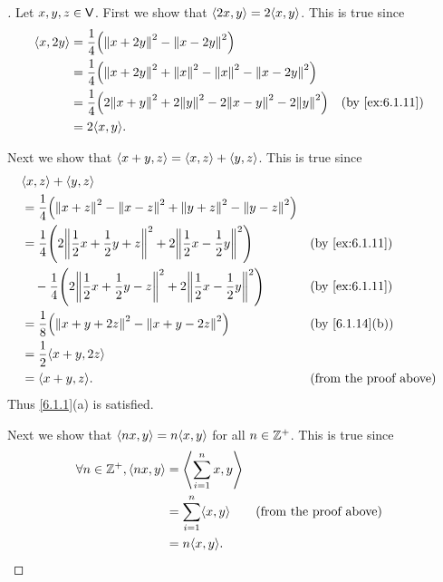 \begin{proof}[]
  Let \(x, y, z \in \mathsf{V}\).
  First we show that \(\inn{2x, y} = 2 \inn{x, y}\).
  This is true since
  \begin{align*}
    \inn{x, 2y} & = \frac{1}{4} \pa{\norm{x + 2y}^2 - \norm{x - 2y}^2}                                                     \\
                & = \frac{1}{4} \pa{\norm{x + 2y}^2 + \norm{x}^2 - \norm{x}^2 - \norm{x - 2y}^2}                           \\
                & = \frac{1}{4} \pa{2 \norm{x + y}^2 + 2 \norm{y}^2 - 2 \norm{x - y}^2 - 2 \norm{y}^2} &  & \by{ex:6.1.11} \\
                & = 2 \inn{x, y}.
  \end{align*}

  Next we show that \(\left\langle x + y, z\right\rangle = \left\langle x, z\right\rangle + \left\langle y, z\right\rangle\).
  This is true since
  \begin{align*}
     & \inn{x, z} + \inn{y, z}                                                                                                                             \\
     & = \frac{1}{4} \pa{\norm{x + z}^2 - \norm{x - z}^2 + \norm{y + z}^2 - \norm{y - z}^2}                                                                \\
     & = \frac{1}{4} \pa{2 \norm{\frac{1}{2} x + \frac{1}{2} y + z}^2 + 2 \norm{\frac{1}{2} x - \frac{1}{2} y}^2}       &  & \by{ex:6.1.11}                \\
     & \quad - \frac{1}{4} \pa{2 \norm{\frac{1}{2} x + \frac{1}{2} y - z}^2 + 2 \norm{\frac{1}{2} x - \frac{1}{2} y}^2} &  & \by{ex:6.1.11}                \\
     & = \frac{1}{8} \pa{\norm{x + y + 2z}^2 - \norm{x + y - 2z}^2}                                                     &  & \by{6.1.14}[b]                \\
     & = \frac{1}{2} \inn{x + y, 2z}                                                                                                                       \\
     & = \inn{x + y, z}.                                                                                                &  & \text{(from the proof above)}
  \end{align*}
  Thus \cref{6.1.1}(a) is satisfied.

  Next we show that \(\inn{nx, y} = n \inn{x, y}\) for all \(n \in \mathbb{Z}^+\).
  This is true since
  \begin{align*}
    \forall n \in \Z^+, \inn{nx, y} & = \inn{\sum_{i = 1}^n x, y}                                    \\
                                    & = \sum_{i = 1}^n \inn{x, y} &  & \text{(from the proof above)} \\
                                    & = n \inn{x, y}.
  \end{align*}


\end{proof}
